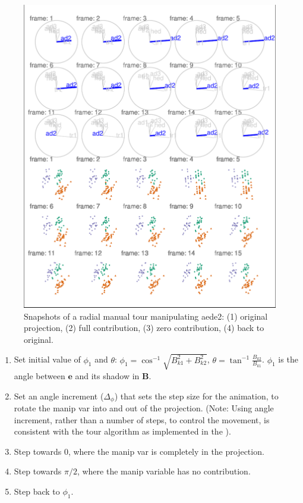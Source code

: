 \begin{Schunk}
\begin{figure}

{\centering \includegraphics[width=1\linewidth]{spinifex_paper_files/figure-latex/step3-1} 

}

\caption[Snapshots of a radial manual tour manipulating aede2]{Snapshots of a radial manual tour manipulating aede2: (1) original projection, (2) full contribution, (3) zero contribution, (4) back to original. }\label{fig:step3}
\end{figure}
\end{Schunk}

\begin{enumerate}
\def\labelenumi{\arabic{enumi}.}
\tightlist
\item
  Set initial value of \(\phi_1\) and \(\theta\):
  \(\phi_1 = \cos^{-1}{\sqrt{B_{k1}^2+B_{k2}^2}}\),
  \(\theta = \tan^{-1}\frac{B_{k2}}{B_{k1}}\). \(\phi_1\) is the angle
  between \(\textbf{e}\) and its shadow in \(\textbf{B}\).
\item
  Set an angle increment (\(\Delta_\phi\)) that sets the step size for
  the animation, to rotate the manip var into and out of the projection.
  (Note: Using angle increment, rather than a number of steps, to
  control the movement, is consistent with the tour algorithm as
  implemented in the ).
\item
  Step towards \(0\), where the manip var is completely in the
  projection.
\item
  Step towards \(\pi/2\), where the manip variable has no contribution.
\item
  Step back to \(\phi_1\).
\end{enumerate}


